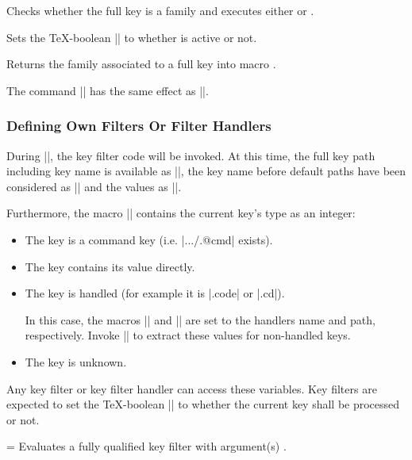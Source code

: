 \begin{command}{\pgfkeysiffamilydefined{}}%
	Checks whether the full key  is a family and executes either  or .
\end{command}

\begin{command}{\pgfkeysisfamilyactive{}}%
	Sets the \TeX-boolean |\ifpgfkeysfiltercontinue| to whether  is active or not.
\end{command}

\begin{command}{\pgfkeysgetfamily{}}%
	Returns the family associated to a full key  into macro .
\end{command}

\begin{command}{\pgfkeyssetfamily{}}%
	The command |\pgfkeyssetfamily| has the same effect as ||.
\end{command}

\subsubsection{Defining Own Filters Or Filter Handlers}
\label{section-key-writing-filters}
	During |\pgfkeysfiltered|, the key filter code will be invoked. At this time, the full key path including key name is available as |\pgfkeyscurrentkey|, the key name before default paths have been considered as |\pgfkeyscurrentkeyRAW| and the values as |\pgfkeyscurrentvalue|. 

	Furthermore, the macro |\pgfkeyscasenumber| contains the current key's type as an integer:
\begin{itemize}
\item[\meta{1}] The key is a command key (i.e. |.../.@cmd| exists).
\item[\meta{2}] The key contains its value directly.
\item[\meta{3}] The key is handled (for example it is |.code| or |.cd|).

In this case, the macros |\pgfkeyscurrentname| and |\pgfkeyscurrentpath| are set to the handlers name and path, respectively.
Invoke |\pgfkeyssplitpath{}| to extract these values for non-handled keys. 
\item[\meta{0}] The key is unknown.
\end{itemize}
	Any key filter or key filter handler can access these variables. Key filters are expected to set the \TeX-boolean |\ifpgfkeysfiltercontinue| to whether the current key shall be processed or not.

\begin{command}{\pgfkeysevalkeyfilterwith{}=}
	Evaluates a fully qualified key filter  with argument(s) .
\begin{codeexample}
\end{codeexample}
\end{command}
\endgroup
